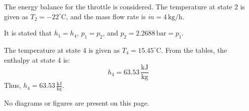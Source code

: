The energy balance for the throttle is considered. The temperature at state 2 is given as \( T_2 = -22^\circ\text{C} \), and the mass flow rate is \( \dot{m} = 4 \, \text{kg/h} \).  

It is stated that \( h_1 = h_4 \), \( p_1 = p_2 \), and \( p_2 = 2.2688 \, \text{bar} = p_1 \).  

The temperature at state 4 is given as \( T_4 = 15.45^\circ\text{C} \). From the tables, the enthalpy at state 4 is:  
\[
h_4 = 63.53 \, \frac{\text{kJ}}{\text{kg}}
\]  
Thus, \( h_4 = 63.53 \, \frac{\text{kJ}}{\text{kg}} \).  

No diagrams or figures are present on this page.